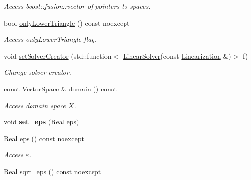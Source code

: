 \begin{DoxyCompactItemize}
\begin{DoxyCompactList}\small\item\em Access boost\-::fusion\-::vector of pointers to spaces. \end{DoxyCompactList}\item 
bool \hyperlink{classSpacy_1_1Kaskade_1_1C2Functional_a37152b2b1413e611d229a61318b86768}{only\-Lower\-Triangle} () const noexcept
\begin{DoxyCompactList}\small\item\em Access only\-Lower\-Triangle flag. \end{DoxyCompactList}\item 
void \hyperlink{classSpacy_1_1Kaskade_1_1C2Functional_ac9496fdef4f38eb466d5b5b58089be8b}{set\-Solver\-Creator} (std\-::function$<$ \hyperlink{namespaceSpacy_adcd0d78166a9c972b8a2e5a689fc2d03}{Linear\-Solver}(const \hyperlink{classSpacy_1_1Kaskade_1_1LinearOperator}{Linearization} \&)$>$ f)
\begin{DoxyCompactList}\small\item\em Change solver creator. \end{DoxyCompactList}\item 
\hypertarget{classSpacy_1_1FunctionalBase_a2d3397deb9fa1ad85ed04e37a03b3aa6}{const \hyperlink{classSpacy_1_1VectorSpace}{Vector\-Space} \& \hyperlink{classSpacy_1_1FunctionalBase_a2d3397deb9fa1ad85ed04e37a03b3aa6}{domain} () const }\label{classSpacy_1_1FunctionalBase_a2d3397deb9fa1ad85ed04e37a03b3aa6}

\begin{DoxyCompactList}\small\item\em Access domain space $X$. \end{DoxyCompactList}\item 
\hypertarget{classSpacy_1_1Mixin_1_1Eps_a818ab6dfab5e4eea583e1302bcc621f8}{void {\bfseries set\-\_\-eps} (\hyperlink{classSpacy_1_1Real}{Real} \hyperlink{classSpacy_1_1Mixin_1_1Eps_a812b99b0abc1d78a34b4114907f23f52}{eps})}\label{classSpacy_1_1Mixin_1_1Eps_a818ab6dfab5e4eea583e1302bcc621f8}

\item 
\hypertarget{classSpacy_1_1Mixin_1_1Eps_a812b99b0abc1d78a34b4114907f23f52}{\hyperlink{classSpacy_1_1Real}{Real} \hyperlink{classSpacy_1_1Mixin_1_1Eps_a812b99b0abc1d78a34b4114907f23f52}{eps} () const noexcept}\label{classSpacy_1_1Mixin_1_1Eps_a812b99b0abc1d78a34b4114907f23f52}

\begin{DoxyCompactList}\small\item\em Access $\varepsilon$. \end{DoxyCompactList}\item 
\hypertarget{classSpacy_1_1Mixin_1_1Eps_a1c1b0ed7f14ed4967dc7da9295a136d4}{\hyperlink{classSpacy_1_1Real}{Real} \hyperlink{classSpacy_1_1Mixin_1_1Eps_a1c1b0ed7f14ed4967dc7da9295a136d4}{sqrt\-\_\-eps} () const noexcept}\label{classSpacy_1_1Mixin_1_1Eps_a1c1b0ed7f14ed4967dc7da9295a136d4}


\end{DoxyCompactItemize}
